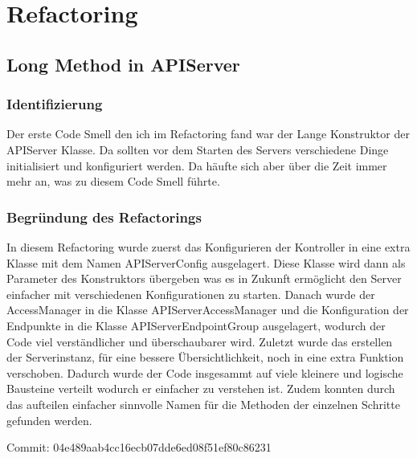 \chapter{Refactoring}

\section{Long Method in APIServer}

\subsection{Identifizierung}

Der erste Code Smell den ich im Refactoring fand war der Lange Konstruktor der APIServer Klasse.
Da sollten vor dem Starten des Servers verschiedene Dinge initialisiert und konfiguriert werden.
Da häufte sich aber über die Zeit immer mehr an, was zu diesem Code Smell führte.

\subsection{Begründung des Refactorings}

In diesem Refactoring wurde zuerst das Konfigurieren der Kontroller in eine extra Klasse mit dem Namen APIServerConfig ausgelagert.
Diese Klasse wird dann als Parameter des Konstruktors übergeben was es in Zukunft ermöglicht den Server einfacher mit verschiedenen Konfigurationen zu starten.
Danach wurde der AccessManager in die Klasse APIServerAccessManager und die Konfiguration der Endpunkte in die Klasse APIServerEndpointGroup ausgelagert,
wodurch der Code viel verständlicher und überschaubarer wird.
Zuletzt wurde das erstellen der Serverinstanz, für eine bessere Übersichtlichkeit, noch in eine extra Funktion verschoben.
Dadurch wurde der Code insgesammt auf viele kleinere und logische Bausteine verteilt wodurch er einfacher zu verstehen ist.
Zudem konnten durch das aufteilen einfacher sinnvolle Namen für die Methoden der einzelnen Schritte gefunden werden.

Commit: 04e489aab4cc16ecb07dde6ed08f51ef80c86231

